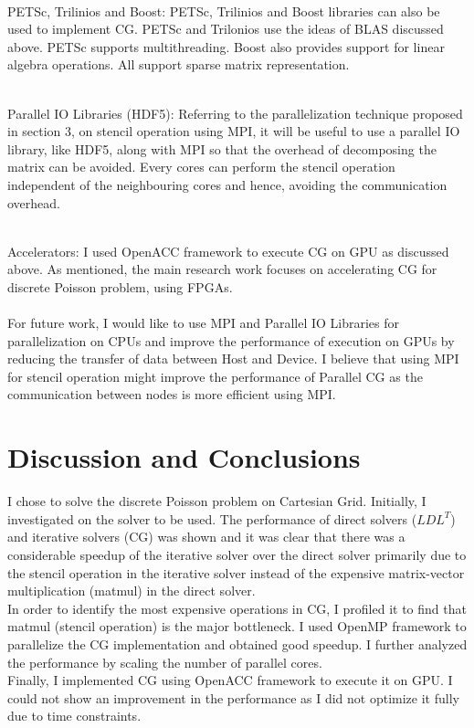 \documentclass{article}
\begin{document}
\begin{spacing}{1.1}
    \\
    PETSc, Trilinios and Boost: PETSc, Trilinios and Boost libraries can also be used to implement CG. PETSc and Trilonios use the ideas of BLAS discussed above. PETSc supports multithreading. Boost also provides support for linear algebra operations. All support sparse matrix representation. 
    
    \\
    Parallel IO Libraries (HDF5): Referring to the parallelization technique proposed in section 3, on stencil operation using MPI, it will be useful to use a parallel IO library, like HDF5, along with MPI so that the overhead of decomposing the matrix can be avoided. Every cores can perform the stencil operation independent of the neighbouring cores and hence, avoiding the communication overhead. 
    
    \\
    Accelerators: I used OpenACC framework to execute CG on GPU as discussed above. As mentioned, the main research work focuses on accelerating CG for discrete Poisson problem, using FPGAs.
    \\
    \\
    For future work, I would like to use MPI and Parallel IO Libraries for parallelization on CPUs and improve the performance of execution on GPUs by reducing the transfer of data between Host and Device. I believe that using MPI for stencil operation might improve the performance of Parallel CG as the communication between nodes is more efficient using MPI. 
    
\section{Discussion and Conclusions}

I chose to solve the discrete Poisson problem on Cartesian Grid. Initially, I investigated on the solver to be used. The performance of direct solvers ($LDL^T$) and iterative solvers (CG) was shown and it was clear that there was a considerable speedup of the iterative solver over the direct solver primarily due to the stencil operation in the iterative solver instead of the expensive matrix-vector multiplication (matmul) in the direct solver. \\
In order to identify the most expensive operations in CG, I profiled it to find that matmul (stencil operation) is the major bottleneck. I used OpenMP framework to parallelize the CG implementation and obtained good speedup. I further analyzed the performance by scaling the number of parallel cores. \\
Finally, I implemented CG using OpenACC framework to execute it on GPU. I could not show an improvement in the performance as I did not optimize it fully due to time constraints. \\


\end{spacing}
\end{document}
